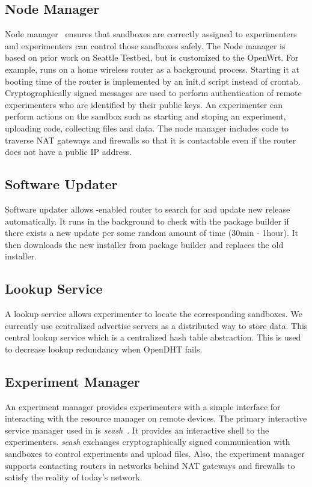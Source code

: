 \subsection{Node Manager}
\label{sec.nodemanager}
Node manager~\cite{nodemanager} ensures that sandboxes are correctly assigned to experimenters and experimenters can control those sandboxes safely. The Node manager is based on prior work on Seattle Testbed, but is customized to the OpenWrt. For example, \sysname runs on a home wireless router as a background process. Starting it at booting time of the router is implemented by an init.d script instead of crontab. Cryptographically signed messages are used to perform authentication of remote experimenters who are identified by their public keys. An experimenter can perform actions on the sandbox such as starting and stoping an experiment, uploading code, collecting files and data. The node manager includes code to traverse NAT gateways and firewalls so that it is contactable even if the router does not have a public IP address. 

\subsection{Software Updater}
\label{sec.softwareupdater}
Software updater allows \sysname-enabled router to search for and update new release automatically. It runs in the background to check with the package builder if there exists a new update per some random amount of time (30min - 1hour). It then downloads the new installer from package builder and replaces the old installer. 

\subsection{Lookup Service}
\label{sec.lookupservice}
A lookup service allows experimenter to locate the corresponding sandboxes. We currently use centralized advertise servers as a distributed way to store data. This central lookup service which is a centralized hash table abstraction. This is used to decrease lookup redundancy when OpenDHT fails.

\subsection{Experiment Manager}
\label{sec.seash}
An experiment manager provides experimenters with a simple interface for interacting with the resource manager on remote devices. The primary interactive service manager used in \sysname is \textit{seash}~\cite{seash}. It provides an interactive shell to the experimenters. \textit{seash} exchanges cryptographically signed communication with sandboxes to control experiments and upload files. Also, the experiment manager supports contacting routers in networks behind NAT gateways and firewalls to satisfy the reality of today's network.


